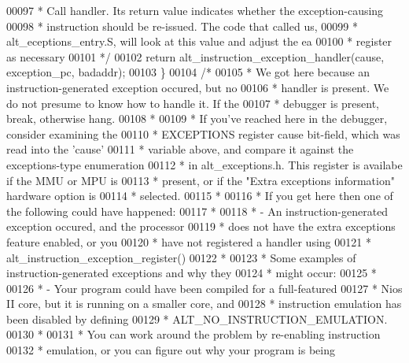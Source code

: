 \begin{DoxyCode}
00097 \textcolor{comment}{     * Call handler. Its return value indicates whether the exception-causing}
00098 \textcolor{comment}{     * instruction should be re-issued. The code that called us,}
00099 \textcolor{comment}{     * alt\_eceptions\_entry.S, will look at this value and adjust the ea}
00100 \textcolor{comment}{     * register as necessary}
00101 \textcolor{comment}{     */}
00102     \textcolor{keywordflow}{return} alt_instruction_exception_handler(cause, exception\_pc, badaddr);
00103   \}
00104   \textcolor{comment}{/*}
00105 \textcolor{comment}{   * We got here because an instruction-generated exception occured, but no}
00106 \textcolor{comment}{   * handler is present. We do not presume to know how to handle it. If the}
00107 \textcolor{comment}{   * debugger is present, break, otherwise hang.}
00108 \textcolor{comment}{   *}
00109 \textcolor{comment}{   * If you've reached here in the debugger, consider examining the}
00110 \textcolor{comment}{   * EXCEPTIONS register cause bit-field, which was read into the 'cause'}
00111 \textcolor{comment}{   * variable above, and compare it against the exceptions-type enumeration}
00112 \textcolor{comment}{   * in alt\_exceptions.h. This register is availabe if the MMU or MPU is}
00113 \textcolor{comment}{   * present, or if the "Extra exceptions information" hardware option is}
00114 \textcolor{comment}{   * selected.}
00115 \textcolor{comment}{   *}
00116 \textcolor{comment}{   *  If you get here then one of the following could have happened:}
00117 \textcolor{comment}{   *}
00118 \textcolor{comment}{   *  - An instruction-generated exception occured, and the processor}
00119 \textcolor{comment}{   *    does not have the extra exceptions feature enabled, or you}
00120 \textcolor{comment}{   *    have not registered a handler using}
00121 \textcolor{comment}{   *    alt\_instruction\_exception\_register()}
00122 \textcolor{comment}{   *}
00123 \textcolor{comment}{   *  Some examples of instruction-generated exceptions and why they}
00124 \textcolor{comment}{   *  might occur:}
00125 \textcolor{comment}{   *}
00126 \textcolor{comment}{   *  - Your program could have been compiled for a full-featured}
00127 \textcolor{comment}{   *    Nios II core, but it is running on a smaller core, and}
00128 \textcolor{comment}{   *    instruction emulation has been disabled by defining}
00129 \textcolor{comment}{   *    ALT\_NO\_INSTRUCTION\_EMULATION.}
00130 \textcolor{comment}{   *}
00131 \textcolor{comment}{   *    You can work around the problem by re-enabling instruction}
00132 \textcolor{comment}{   *    emulation, or you can figure out why your program is being}

\end{DoxyCode}
